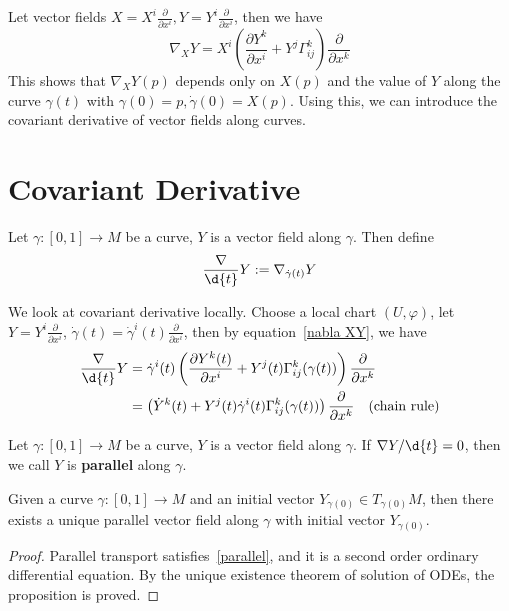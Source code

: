 Let vector fields $X=X^i\frac{\partial{}}{\partial{x^i}},Y=Y^i\frac{\partial{}}{\partial{x^i}}$, then we have
\begin{equation}
    \nabla_XY=X^i\left(\frac{\partial{Y^k}}{\partial{x^i}}+Y^j\Gamma^k_{ij}\right)\frac{\partial{}}{\partial{x^k}}\label{nabla XY}
\end{equation}
This shows that $\nabla_XY(p)$ depends only on $X(p)$ and the value of $Y$ along the curve $\gamma(t)$ with $\gamma(0)=p,\dot{\gamma}(0)=X(p)$.
Using this, we can introduce the covariant derivative of vector fields along curves.

\section{Covariant Derivative}
\begin{defn}
    Let $\gamma:[0,1]\to M$ be a curve, $Y$ is a vector field along $\gamma$.
    Then define
    \[\frac{\nabla}{\d{t}}Y:=\nabla_{\dot{\gamma}(t)}Y\]
\end{defn}

We look at covariant derivative locally.
Choose a local chart $(U,\varphi)$, let $Y=Y^i\frac{\partial{}}{\partial{x^i}}$, $\dot{\gamma}(t)=\dot{\gamma}^i(t)\frac{\partial{}}{\partial{x^i}}$, then by equation~\eqref{nabla XY}, we have
\begin{equation}
    \begin{aligned}
        \frac{\nabla}{\d{t}}Y&=\dot{\gamma}^i(t)\left(\frac{\partial{Y^k(t)}}{\partial{x^i}}+Y^j(t)\Gamma^k_{ij}(\gamma(t))\right)\frac{\partial{}}{\partial{x^k}}\\
        &=\left(\dot{Y}^k(t)+Y^j(t)\dot{\gamma}^i(t)\Gamma^k_{ij}(\gamma(t))\right)\frac{\partial{}}{\partial{x^k}}\quad\text{(chain rule)}
    \end{aligned}\label{parallel}
\end{equation}

\begin{defn}
    Let $\gamma:[0,1]\to M$ be a curve, $Y$ is a vector field along $\gamma$.
    If $\nabla Y/\d{t}=0$, then we call $Y$ is \textbf{parallel} along $\gamma$.
\end{defn}

\begin{prop}
    Given a curve $\gamma:[0,1]\to M$ and an initial vector $Y_{\gamma(0)}\in T_{\gamma(0)}M$, then there exists a unique parallel vector field along $\gamma$ with initial vector $Y_{\gamma(0)}$.
\end{prop}
\begin{proof}
    Parallel transport satisfies~\eqref{parallel}, and it is a second order ordinary differential equation.
    By the unique existence theorem of solution of ODEs, the proposition is proved.
\end{proof}

